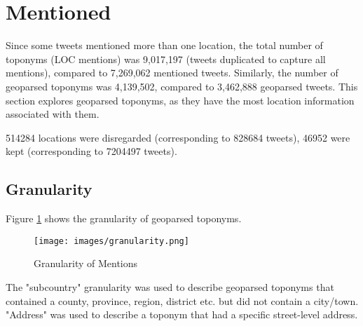 \section{Mentioned}

Since some tweets mentioned more than one location, the total number of toponyms (LOC mentions) was 9,017,197 (tweets duplicated to capture all mentions), compared to 7,269,062 mentioned tweets. Similarly, the number of geoparsed toponyms was 4,139,502, compared to 3,462,888 geoparsed tweets. This section explores geoparsed toponyms, as they have the most location information associated with them.

514284 locations were disregarded (corresponding to 828684 tweets), 46952 were kept (corresponding to 7204497 tweets). 

 
\subsection{Granularity}

Figure \ref{fig:mention-pie} shows the granularity of geoparsed toponyms. 

\begin{figure}[H]
    \centering
    \texttt{[image: images/granularity.png]}
    
    \caption{Granularity of Mentions}
    \label{fig:mention-pie}
\end{figure}

The "subcountry" granularity was used to describe geoparsed toponyms that contained a county, province, region, district etc. but did not contain a city/town. "Address" was used to describe a toponym that had a specific street-level address.

\begin{comment}
\begin{table}[H]
  \centering
  \begin{tabular}{|c|c|c|}
    \hline
    \textbf{Granularity} & \textbf{Number of Tweets} & \textbf{Proportion}\\
    \hline
    city/town &	1570867 &	0.379482 \\
    \hline
    country &	1290046 &	0.311643 \\
    \hline
    subcountry &	773963 &	0.186970 \\
    address & 	504626 & 	0.121905 \\
    \hline
  \end{tabular}
  \caption{Geoparsed Toponym Granularity}
  \label{tab:granularity}
\end{table}
\end{comment}

